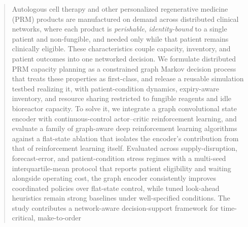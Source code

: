 \documentclass[preprint,review,12pt,nonatbib]{elsarticle}
\providecommand{\DIFadd}[1]{{\protect\color{blue}#1}} %
\providecommand{\DIFdel}[1]{} %
\providecommand{\DIFaddbegin}{} %
\providecommand{\DIFaddend}{} %
\providecommand{\DIFdelbegin}{} %
\providecommand{\DIFdelend}{} %
\providecommand{\DIFscaledelfig}{0.5}
\newlength{\DIFdelgraphicswidth} %
\newlength{\DIFdelgraphicsheight} %
\providecommand{\DIFaddincludegraphics}[2][]{{\color{blue}\fbox{\DIFOincludegraphics[#1]{#2}}}} %
\providecommand{\DIFdelincludegraphics}[2][]{%
\sbox{\DIFdelgraphicsbox}{\DIFOincludegraphics[#1]{#2}}%
\settoboxwidth{\DIFdelgraphicswidth}{\DIFdelgraphicsbox} %
\settoboxtotalheight{\DIFdelgraphicsheight}{\DIFdelgraphicsbox} %
\scalebox{\DIFscaledelfig}{%
\parbox[b]{\DIFdelgraphicswidth}{\usebox{\DIFdelgraphicsbox}\\[-\baselineskip] \rule{\DIFdelgraphicswidth}{0em}}\llap{\resizebox{\DIFdelgraphicswidth}{\DIFdelgraphicsheight}{%
\setlength{\unitlength}{\DIFdelgraphicswidth}%
\begin{picture}(1,1)%
\thicklines\linethickness{2pt} %
{\color[rgb]{1,0,0}\put(0,0){\framebox(1,1){}}}%
{\color[rgb]{1,0,0}\put(0,0){\line( 1,1){1}}}%
{\color[rgb]{1,0,0}\put(0,1){\line(1,-1){1}}}%
\end{picture}%
}\hspace*{3pt}}} %
} %
\DeclareRobustCommand{\DIFaddbegin}{\DIFOaddbegin \let\includegraphics\DIFaddincludegraphics} %
\DeclareRobustCommand{\DIFaddend}{\DIFOaddend \let\includegraphics\DIFOincludegraphics} %
\DeclareRobustCommand{\DIFdelbegin}{\DIFOdelbegin \let\includegraphics\DIFdelincludegraphics} %
\DeclareRobustCommand{\DIFdelend}{\DIFOaddend \let\includegraphics\DIFOincludegraphics} %
\begin{document}
\begin{frontmatter}
\begin{abstract}
\DIFdelbegin \DIFdel{Distributed make-to-order manufacturing networks require adaptive decision policies because demand, supply availability, and resource states evolve over time and across connected facilities. This study develops a graph-aware deep reinforcement learning framework for adaptive capacity planning in distributed }\DIFdelend \DIFaddbegin \DIFadd{Autologous cell therapy and other }\DIFaddend personalized regenerative medicine \DIFdelbegin \DIFdel{manufacturing networks. The artificial intelligence contribution is the integration of graph convolutional networks with deep deterministic policy gradient learning. The graph convolutional component encodes inter-facility dependencies and transshipment relationships, while the actor--critic reinforcement learning component learns continuous }\DIFdelend \DIFaddbegin \DIFadd{(PRM) products are manufactured on demand across distributed clinical networks, where each product is }\emph{\DIFadd{perishable}}\DIFadd{, }\emph{\DIFadd{identity-bound}} \DIFadd{to a single patient and non-fungible, and needed only while that patient remains clinically eligible. These characteristics couple }\DIFaddend capacity, inventory, and \DIFdelbegin \DIFdel{transshipment decisions through interaction with a production simulation environment. The engineering application is autologous cell therapy manufacturing, where production can begin only when a patient specimen, an idle bioreactor , and sufficient consumables are available. The experimental design further motivates a flat-state DDPG ablation to isolate the value of the graph encoderfrom the value of }\DIFdelend \DIFaddbegin \DIFadd{patient outcomes into one networked decision. We formulate distributed PRM capacity planning as a constrained graph Markov decision process that treats these properties as first-class, and release a reusable simulation testbed realizing it, with patient-condition dynamics, expiry-aware inventory, and resource sharing restricted to fungible reagents and idle bioreactor capacity. To solve it, we integrate a graph convolutional state encoder with continuous-control }\DIFaddend actor--critic \DIFaddbegin \DIFadd{reinforcement learning, and evaluate a family of graph-aware deep reinforcement learning algorithms against a flat-state ablation that isolates the encoder's contribution from that of }\DIFaddend reinforcement learning itself. \DIFdelbegin \DIFdel{The results indicate that the proposed GCN-DDPG framework achieves robust costperformance under high disruption rates and adapts effectively to inaccurate and non-stationary demand forecasts}\DIFdelend \DIFaddbegin \DIFadd{Evaluated across supply-disruption, forecast-error, and patient-condition stress regimes with a multi-seed interquartile-mean protocol that reports patient eligibility and waiting alongside operating cost, the graph encoder consistently improves coordinated policies over flat-state control, while tuned look-ahead heuristics remain strong baselines under well-specified conditions}\DIFaddend . The study contributes \DIFdelbegin \DIFdel{an intelligent, }\DIFdelend \DIFaddbegin \DIFadd{a }\DIFaddend network-aware decision-support \DIFdelbegin \DIFdel{approach for distributed }\DIFdelend \DIFaddbegin \DIFadd{framework for time-critical, make-to-order }\DIFaddend 
\end{abstract}
\end{frontmatter}
\end{document}
